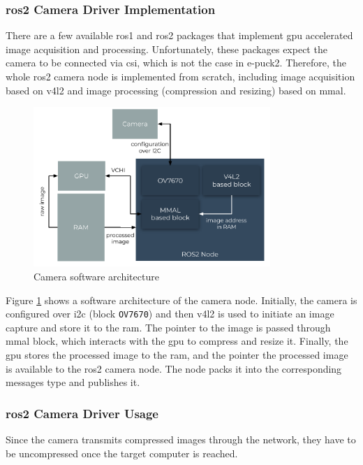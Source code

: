 \subsubsection{\ac{ros2} Camera Driver Implementation}
There are a few available \ac{ros1} and \ac{ros2} packages that implement \ac{gpu} accelerated image acquisition and processing.
Unfortunately, these packages expect the camera to be connected via \ac{csi}, which is not the case in e-puck2. 
Therefore, the whole \ac{ros2} camera node is implemented from scratch, including image acquisition based on \acs{v4l2} and image processing (compression and resizing) based on \ac{mmal}.
 
 \begin{figure}[H]
    \centering
    \includegraphics[width=0.8\textwidth]{physical/figures/camera_software_architecture.pdf}
    \caption{Camera software architecture}
    \label{fig:physical:camera_software_architecture}
\end{figure}
 
Figure \ref{fig:physical:camera_software_architecture} shows a software architecture of the camera node. 
Initially, the camera is configured over \ac{i2c} (block \texttt{OV7670}) and then \ac{v4l2} is used to initiate an image capture and store it to the \ac{ram}.
The pointer to the image is passed through \ac{mmal} block, which interacts with the \ac{gpu} to compress and resize it. 
Finally, the \ac{gpu} stores the processed image to the \ac{ram}, and the pointer the processed image is available to the \ac{ros2} camera node.
The node packs it into the corresponding messages type and publishes it.
 
 \subsubsection{\ac{ros2} Camera Driver Usage}
 Since the camera transmits compressed images through the network, they have to be uncompressed once the target computer is reached.
 
